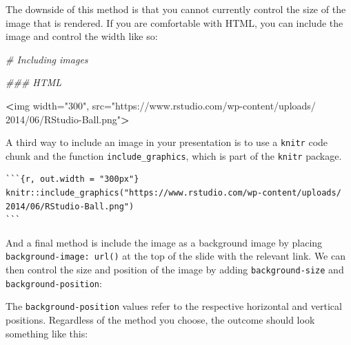\documentclass[
]{book}
\newenvironment{Shaded}{\begin{snugshade}}{\end{snugshade}}
\newcommand{\CommentTok}[1]{\textcolor[rgb]{0.37,0.37,0.37}{\textit{#1}}}
\newcommand{\DecValTok}[1]{\textcolor[rgb]{0.06,0.06,0.06}{#1}}
\newcommand{\ErrorTok}[1]{\textcolor[rgb]{0.14,0.14,0.14}{\textbf{#1}}}
\newcommand{\KeywordTok}[1]{\textcolor[rgb]{0.27,0.27,0.27}{\textbf{#1}}}
\newcommand{\NormalTok}[1]{#1}
\newcommand{\OperatorTok}[1]{\textcolor[rgb]{0.43,0.43,0.43}{\textbf{#1}}}
\newcommand{\StringTok}[1]{\textcolor[rgb]{0.5,0.5,0.5}{#1}}
\begin{document}
The downside of this method is that you cannot currently control the size of the image that is rendered. If you are comfortable with HTML, you can include the image and control the width like so:

\begin{Shaded}
\begin{Highlighting}[]
\CommentTok{# Including images}

\CommentTok{### HTML}

\OperatorTok{<}\NormalTok{img width=}\StringTok{"300"}\NormalTok{, src=}\StringTok{"https://www.rstudio.com/wp-content/uploads/}
\StringTok{2014/06/RStudio-Ball.png"}\OperatorTok{>}
\end{Highlighting}
\end{Shaded}

A third way to include an image in your presentation is to use a \texttt{knitr} code chunk and the function \texttt{include\_graphics}, which is part of the \texttt{knitr} package.

\begin{verbatim}
```{r, out.width = "300px"}
knitr::include_graphics("https://www.rstudio.com/wp-content/uploads/
2014/06/RStudio-Ball.png")
```
\end{verbatim}

And a final method is include the image as a background image by placing \texttt{background-image:\ url()} at the top of the slide with the relevant link. We can then control the size and position of the image by adding \texttt{background-size} and \texttt{background-position}:

\begin{Shaded}
\end{Shaded}

The \texttt{background-position} values refer to the respective horizontal and vertical positions. Regardless of the method you choose, the outcome should look something like this:
\end{document}
